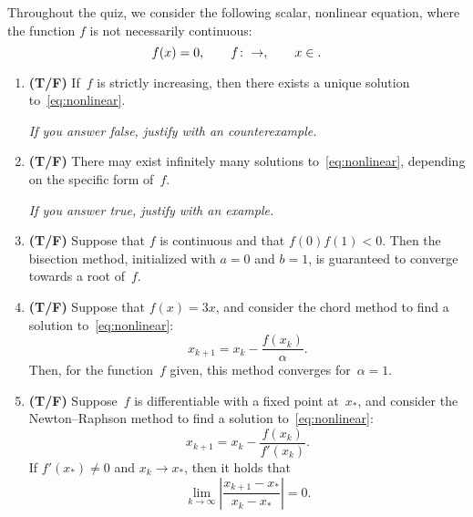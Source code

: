 \documentclass{article}
\begin{document}
    Throughout the quiz, we consider the following scalar, nonlinear equation,
    where the function $f$ is not necessarily continuous:
    \begin{equation}
        \label{eq:nonlinear}
        f(x) = 0,
        \qquad f\colon \real \to \real,
        \qquad x \in \real.
    \end{equation}

\begin{enumerate}

    \item
        \textbf{(T/F)}
        If~$f$ is strictly increasing,
        then there exists a unique solution to~\eqref{eq:nonlinear}.

        \emph{If you answer false, justify with an counterexample.}
        \vspace{.7cm}

    \item
        \textbf{(T/F)}
        There may exist infinitely many solutions to~\eqref{eq:nonlinear},
        depending on the specific form of~$f$.

        \emph{If you answer true, justify with an example.}
        \vspace{.7cm}

    \item
        \textbf{(T/F)}
        Suppose that $f$ is continuous and that $f(0) f(1) < 0$.
        Then the bisection method, initialized with $a = 0$ and $b = 1$,
        is guaranteed to converge towards a root of~$f$.

    \item
        \textbf{(T/F)}
        Suppose that $f(x) = 3x$,
        and consider the chord method to find a solution to~\eqref{eq:nonlinear}:
        \begin{equation*}
            x_{k+1} = x_k - \frac{f(x_k)}{\alpha}.
        \end{equation*}
        Then, for the function~$f$ given,
        this method converges for~$\alpha = 1$.

    \item
        \textbf{(T/F)}
        Suppose~$f$ is differentiable with a fixed point at~$x_*$,
        and consider the Newton--Raphson method to find a solution to~\eqref{eq:nonlinear}:
        \begin{equation}
            \label{eq:chord}
            x_{k+1} = x_k - \frac{f(x_k)}{f'(x_k)}.
        \end{equation}
        If $f'(x_*) \neq 0$ and $x_k \to x_*$,
        then it holds that
        \[
            \lim_{k \to \infty} \left\lvert \frac{x_{k+1} - x_*}{x_{k} - x_*} \right\rvert
            = 0.
        \]


\end{enumerate}
\end{document}
